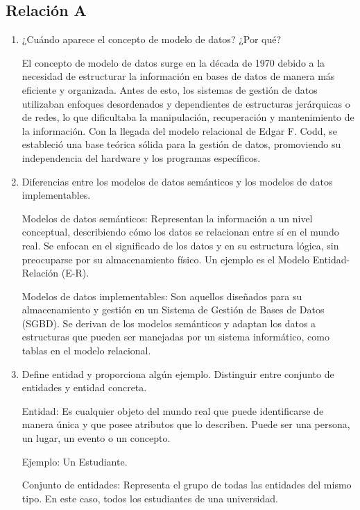 \subsection{Relación A}

\begin{enumerate}[label=\textbf{\arabic*.}, itemsep=0.5em]
    \item ¿Cuándo aparece el concepto de modelo de datos? ¿Por qué?
    
    El concepto de modelo de datos surge en la década de 1970 debido a la necesidad de estructurar la información en bases de datos de manera más eficiente y organizada. Antes de esto, los sistemas de gestión de datos utilizaban enfoques desordenados y dependientes de estructuras jerárquicas o de redes, lo que dificultaba la manipulación, recuperación y mantenimiento de la información. Con la llegada del modelo relacional de Edgar F. Codd, se estableció una base teórica sólida para la gestión de datos, promoviendo su independencia del hardware y los programas específicos.

    \item Diferencias entre los modelos de datos semánticos y los modelos de datos implementables.
    
    Modelos de datos semánticos: Representan la información a un nivel conceptual, describiendo cómo los datos se relacionan entre sí en el mundo real. Se enfocan en el significado de los datos y en su estructura lógica, sin preocuparse por su almacenamiento físico. Un ejemplo es el Modelo Entidad-Relación (E-R).

    Modelos de datos implementables: Son aquellos diseñados para su almacenamiento y gestión en un Sistema de Gestión de Bases de Datos (SGBD). Se derivan de los modelos semánticos y adaptan los datos a estructuras que pueden ser manejadas por un sistema informático, como tablas en el modelo relacional.

    \item Define entidad y proporciona algún ejemplo. Distinguir entre conjunto de entidades y entidad concreta.

        Entidad: Es cualquier objeto del mundo real que puede identificarse de manera única y que posee atributos que lo describen. Puede ser una persona, un lugar, un evento o un concepto.

        Ejemplo: Un Estudiante.

        Conjunto de entidades: Representa el grupo de todas las entidades del mismo tipo. En este caso, todos los estudiantes de una universidad.


\end{enumerate}
